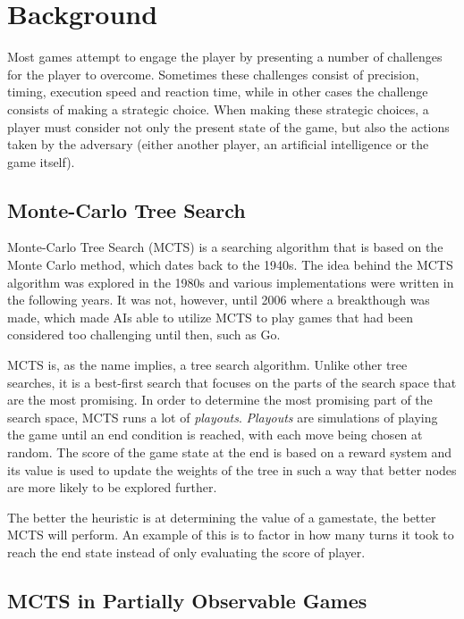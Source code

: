 \section{Background}
\label{02}
Most games attempt to engage the player by presenting a number of challenges for the player to overcome. Sometimes these challenges consist of precision, timing, execution speed and reaction time, while in other cases the challenge consists of making a strategic choice. When making these strategic choices, a player must consider not only the present state of the game, but also the actions taken by the adversary (either another player, an artificial intelligence or the game itself). 

\subsection{Monte-Carlo Tree Search}
\label{02_MCTS}

Monte-Carlo Tree Search\cite{browne2012survey} (MCTS) is a searching algorithm that is based on the Monte Carlo method, which dates back to the 1940s. The idea behind the MCTS algorithm was explored in the 1980s and various implementations were written in the following years. It was not, however, until 2006 where a breakthough was made, which made AIs able to utilize MCTS to play games that had been considered too challenging until then, such as Go\cite{gelly2011monte}\cite{chaslot2010monte}.

MCTS is, as the name implies, a tree search algorithm. Unlike other tree searches, it is a best-first search that focuses on the parts of the search space that are the most promising. In order to determine the most promising part of the search space, MCTS runs a lot of \textit{playouts}. \textit{Playouts} are simulations of playing the game until an end condition is reached, with each move being chosen at random. The score of the game state at the end is based on a reward system and its value is used to update the weights of the tree in such a way that better nodes are more likely to be explored further.

The better the heuristic is at determining the value of a gamestate, the better MCTS will perform. An example of this is to factor in how many turns it took to reach the end state instead of only evaluating the score of player.


\subsection{MCTS in Partially Observable Games}


